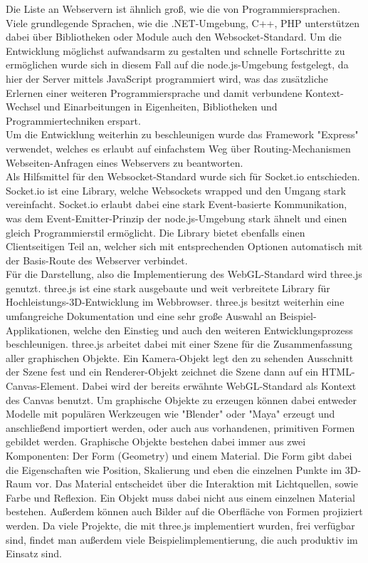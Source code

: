 Die Liste an Webservern ist ähnlich groß, wie die von Programmiersprachen. Viele grundlegende Sprachen, wie die .NET-Umgebung, C++, PHP \ua unterstützen dabei über Bibliotheken oder Module auch den Websocket-Standard. Um die Entwicklung möglichst aufwandsarm zu gestalten und schnelle Fortschritte zu ermöglichen wurde sich in diesem Fall auf die node.js-Umgebung festgelegt, da hier der Server mittels JavaScript programmiert wird, was das zusätzliche Erlernen einer weiteren Programmiersprache und damit verbundene Kontext-Wechsel und Einarbeitungen in Eigenheiten, Bibliotheken und Programmiertechniken erspart.\\
Um die Entwicklung weiterhin zu beschleunigen wurde das Framework "Express" verwendet, welches es erlaubt auf einfachstem Weg über Routing-Mechanismen Webseiten-Anfragen eines Webservers zu beantworten.\\
Als Hilfsmittel für den Websocket-Standard wurde sich für Socket.io entschieden. Socket.io ist eine Library, welche Websockets wrapped und den Umgang stark vereinfacht. Socket.io erlaubt dabei eine stark Event-basierte Kommunikation, was dem Event-Emitter-Prinzip der node.js-Umgebung stark ähnelt und einen gleich Programmierstil ermöglicht. Die Library bietet ebenfalls einen Clientseitigen Teil an, welcher sich mit entsprechenden Optionen automatisch mit der Basis-Route des Webserver verbindet.\\
Für die Darstellung, also die Implementierung des WebGL-Standard wird three.js genutzt. three.js ist eine stark ausgebaute und weit verbreitete Library für Hochleistungs-3D-Entwicklung im Webbrowser. three.js besitzt weiterhin eine umfangreiche Dokumentation und eine sehr große Auswahl an Beispiel-Applikationen, welche den Einstieg und auch den weiteren Entwicklungsprozess beschleunigen. three.js arbeitet dabei mit einer Szene für die Zusammenfassung aller graphischen Objekte. Ein Kamera-Objekt legt den zu sehenden Ausschnitt der Szene fest und ein Renderer-Objekt zeichnet die Szene dann auf ein HTML-Canvas-Element. Dabei wird der bereits erwähnte WebGL-Standard als Kontext des Canvas benutzt. Um graphische Objekte zu erzeugen können dabei entweder Modelle mit populären Werkzeugen wie "Blender" oder "Maya" erzeugt und anschließend importiert werden, oder auch aus vorhandenen, primitiven Formen gebildet werden. Graphische Objekte bestehen dabei immer aus zwei Komponenten: Der Form (Geometry) und einem Material. Die Form gibt dabei die Eigenschaften wie Position, Skalierung und eben die einzelnen Punkte im 3D-Raum vor. Das Material entscheidet über die Interaktion mit Lichtquellen, sowie Farbe und Reflexion. Ein Objekt muss dabei nicht aus einem einzelnen Material bestehen. Außerdem können auch Bilder auf die Oberfläche von Formen projiziert werden. Da viele Projekte, die mit three.js implementiert wurden, frei verfügbar sind, findet man außerdem viele Beispielimplementierung, die auch produktiv im Einsatz sind.

